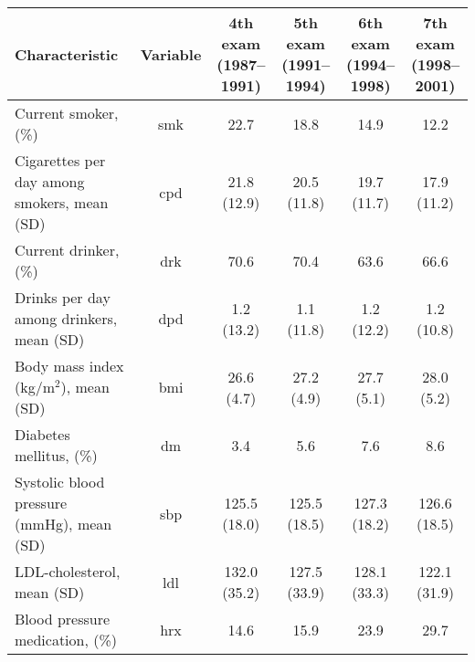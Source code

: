
\begin{tabular}{lccccc}
\toprule
Characteristic & Variable & \shortstack{4th exam \\ (1987–1991)} & \shortstack{5th exam \\ (1991–1994)} & \shortstack{6th exam \\ (1994–1998)} & \shortstack{7th exam \\ (1998–2001)}\\
\midrule
Current smoker, (\%) & smk & 22.7 & 18.8 & 14.9 & 12.2\\
Cigarettes per day among smokers, mean (SD) & cpd & 21.8 (12.9) & 20.5 (11.8) & 19.7 (11.7) & 17.9 (11.2)\\
Current drinker, (\%) & drk & 70.6 & 70.4 & 63.6 & 66.6\\
Drinks per day among drinkers, mean (SD) & dpd & 1.2 (13.2) & 1.1 (11.8) & 1.2 (12.2) & 1.2 (10.8)\\
Body mass index (kg/m$^2$), mean (SD) & bmi & 26.6 (4.7) & 27.2 (4.9) & 27.7 (5.1) & 28.0 (5.2)\\
Diabetes mellitus, (\%) & dm & 3.4 & 5.6 & 7.6 & 8.6\\
Systolic blood pressure (mmHg), mean (SD) & sbp & 125.5 (18.0) & 125.5 (18.5) & 127.3 (18.2) & 126.6 (18.5)\\
LDL-cholesterol, mean (SD) & ldl & 132.0 (35.2) & 127.5 (33.9) & 128.1 (33.3) & 122.1 (31.9)\\
Blood pressure medication, (\%) & hrx & 14.6 & 15.9 & 23.9 & 29.7\\
\bottomrule
\end{tabular}
